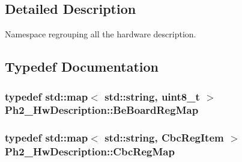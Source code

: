 \subsection{Detailed Description}
Namespace regrouping all the hardware description. 

\subsection{Typedef Documentation}
\hypertarget{namespace_ph2___hw_description_a9b77ad2bbc2b144cdd4f1574b31eaa20}{
\subsubsection[{Be\-Board\-Reg\-Map}]{\setlength{\rightskip}{0pt plus 5cm}typedef std\-::map$<$ std\-::string, uint8\-\_\-t $>$ {\bf Ph2\-\_\-\-Hw\-Description\-::\-Be\-Board\-Reg\-Map}}}\label{namespace_ph2___hw_description_a9b77ad2bbc2b144cdd4f1574b31eaa20}
\hypertarget{namespace_ph2___hw_description_a9a23b373068f169aa67ca1d22c9a6001}{
\subsubsection[{Cbc\-Reg\-Map}]{\setlength{\rightskip}{0pt plus 5cm}typedef std\-::map$<$ std\-::string, {\bf Cbc\-Reg\-Item} $>$ {\bf Ph2\-\_\-\-Hw\-Description\-::\-Cbc\-Reg\-Map}}}\label{namespace_ph2___hw_description_a9a23b373068f169aa67ca1d22c9a6001}


